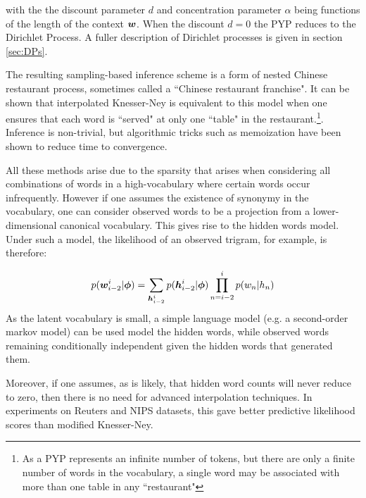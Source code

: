 with the the discount parameter $d$ and concentration parameter $\alpha$ being functions of the length of the context $\bm w$. When the discount $d=0$ the PYP reduces to the Dirichlet Process. A fuller description of Dirichlet processes is given in section \ref{sec:DPs}.

The resulting sampling-based inference scheme is a form of nested Chinese restaurant process, sometimes called a ``Chinese restaurant franchise". It can be shown that interpolated Knesser-Ney is equivalent to this model when one ensures that each word is ``served" at only one ``table" in the restaurant.\footnote{As a PYP represents an infinite number of tokens, but there are only a finite number of words in the vocabulary, a single word may be associated with more than one table in any ``restaurant"}. Inference is non-trivial, but algorithmic tricks such as memoization have been shown\cite{Wood2011} to reduce time to convergence.

All these methods arise due to the sparsity that arises when considering all combinations of words in a high-vocabulary where certain words occur infrequently. However if one assumes the existence of synonymy in the vocabulary, one can consider observed words to be a projection from a lower-dimensional canonical vocabulary. This gives rise to the hidden words model\cite{Deschacht2012}. Under such a model, the likelihood of an observed trigram, for example, is therefore:

\begin{align}
p(\bm w^i_{i-2}|\bm \phi) = \sum_{\bm h^i_{i-2}} p(\bm h^i_{i-2}|\bm \phi) \prod_{n=i-2}^i p(w_n | h_n)
\end{align}
As the latent vocabulary is small, a simple language model (e.g. a second-order markov model) can be used model the hidden words, while observed words remaining conditionally independent given the hidden words that generated them. 
 
Moreover, if one assumes, as is likely, that hidden word counts will never reduce to zero, then there is no need for advanced interpolation techniques. In experiments on Reuters and NIPS datasets, this gave better predictive likelihood scores than modified Knesser-Ney.


